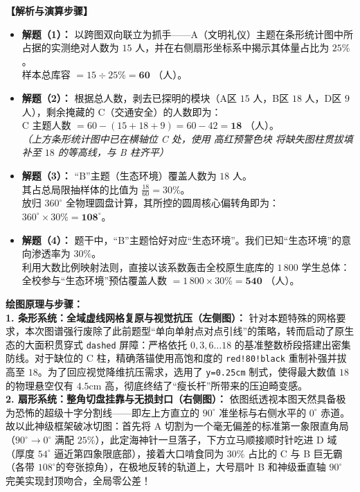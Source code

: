 \vspace{0.4cm}
\textbf{【解析与演算步骤】}
\begin{itemize}
    \item \textbf{解题（1）：} 以跨图双向联立为抓手——A（文明礼仪）主题在条形统计图中所占据的实测绝对人数为 $15$ 人，并在右侧扇形坐标系中揭示其体量占比为 $25\%$。\\
    样本总库容 $= 15 \div 25\% = \mathbf{60}$ （人）。
    \item \textbf{解题（2）：} 根据总人数，剥去已探明的模块（A区 $15$ 人，B区 $18$ 人，D区 $9$ 人），剩余掩藏的 C（交通安全）的人数即为：\\
    C 主题人数 $= 60 - (15 + 18 + 9) = 60 - 42 = \mathbf{18}$ （人）。\\
    \textit{（上方条形统计图中已在横轴位 C 处，使用 \textcolor{red!80!black}{高红预警色块} 将缺失图柱贯拔填补至 $18$ 的等高线，与 B 柱齐平）}
    \item \textbf{解题（3）：} “B”主题（生态环境）覆盖人数为 $18$ 人。\\
    其占总局限抽样体的比值为 $\frac{18}{60} = 30\%$。\\
    放归 $360^\circ$ 全物理圆盘计算，其所控的圆周核心偏转角即为：$360^\circ \times 30\% = \mathbf{108^\circ}$。
    \item \textbf{解题（4）：} 题干中，“B”主题恰好对应“生态环境”。我们已知“生态环境”的意向渗透率为 $30\%$。\\
    利用大数比例映射法则，直接以该系数轰击全校原生底库的 $1\,800$ 学生总体：\\
    全校参与“生态环境”预估覆盖人数 $= 1\,800 \times 30\% = \mathbf{540}$ （人）。
\end{itemize}

\vspace{0.4cm}
{\small\color{blue!70!black}
\textbf{绘图原理与步骤：}\\
\textbf{1. 条形系统：全域虚线网格复原与视觉抗压（左侧图）：} 针对本题特殊的网格要求，本次图谱强行废除了此前题型“单向单射点对点引线”的策略，转而启动了原生态的大面积贯穿式 \texttt{dashed} 屏障：严格依托 $0, 3, 6 \dots 18$ 的基准整数桥段搭建出密集防线。对于缺位的 C 柱，精确落锚使用高饱和度的 \texttt{red!80!black} 重制补强并拔高至 $18$。为了回应视觉降维抗压需求，选用了 \texttt{y=0.25cm} 制式，使得最大数值 $18$ 的物理悬空仅有 $4.5\mathrm{cm}$ 高，彻底终结了“瘦长杆”所带来的压迫畸变感。\\
\textbf{2. 扇形系统：整角切盘挂靠与无损封口（右侧图）：} 依图纸透视本图天然具备极为恐怖的超级十字分割线——即左上方直立的 $90^\circ$ 准坐标与右侧水平的 $0^\circ$ 赤道。故以此神级框架破冰切图：首先将 A 切割为一个毫无偏差的标准第一象限直角局（$90^\circ \to 0^\circ$ 满配 $25\%$），此定海神针一旦落子，下方立马顺接顺时针吃进 D 域（厚度 $54^\circ$ 逼近第四象限底部），接着大口啃食同为 $30\%$ 占比的 C 与 B 巨无霸（各带 $108^\circ$的夸张掠角），在极地反转的轨道上，大号扇叶 B 和神级垂直轴 $90^\circ$ 完美实现封顶吻合，全局零公差！
}


